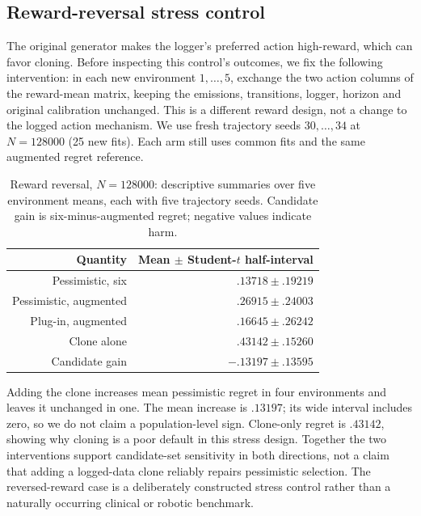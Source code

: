 \documentclass[11pt]{article}
\begin{document}
\subsection{Reward-reversal stress control}
The original generator makes the logger's preferred action high-reward,
which can favor cloning. Before inspecting this control's outcomes, we fix
the following intervention: in each new environment $1,\ldots,5$, exchange
the two action columns of the reward-mean matrix, keeping the emissions,
transitions, logger, horizon and original calibration unchanged. This is a
different reward design, not a change to the logged action mechanism.
We use fresh trajectory seeds $30,\ldots,34$ at $N=128000$ (25 new fits).
Each arm still uses common fits and the same augmented regret reference.

\begin{table}[t]
\centering\small
\caption{Reward reversal, $N=128000$: descriptive summaries over five
environment means, each with five trajectory seeds. Candidate gain is
six-minus-augmented regret; negative values indicate harm.}
\begin{tabular}{rr}\toprule
Quantity & Mean $\pm$ Student-$t$ half-interval\\\midrule
Pessimistic, six & $.13718\pm.19219$\\
Pessimistic, augmented & $.26915\pm.24003$\\
Plug-in, augmented & $.16645\pm.26242$\\
Clone alone & $.43142\pm.15260$\\
Candidate gain & $-.13197\pm.13595$\\\bottomrule
\end{tabular}\label{tab:reversal}
\end{table}

Adding the clone increases mean pessimistic regret in four environments and
leaves it unchanged in one. The mean increase is $.13197$; its wide interval
includes zero, so we do not claim a population-level sign. Clone-only regret
is $.43142$, showing why cloning is a poor default in this stress design.
Together the two interventions support candidate-set sensitivity in both
directions, not a claim that adding a logged-data clone reliably repairs
pessimistic selection. The reversed-reward case is a deliberately constructed
stress control rather than a naturally occurring clinical or robotic benchmark.
\end{document}

